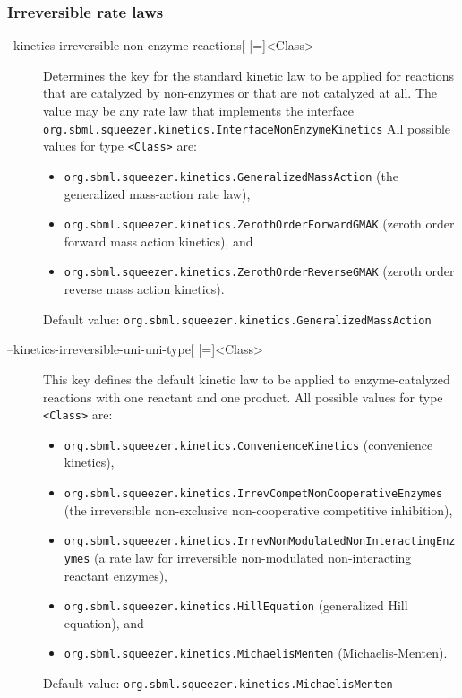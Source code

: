 \subsubsection{Irreversible rate laws}
\begin{description}
\item[--kinetics-irreversible-non-enzyme-reactions{[} |={]}<Class>]
  Determines the key for the standard kinetic law to be applied
  for reactions that are catalyzed by non-enzymes or that are
  not catalyzed at all. The value may be any rate law that implements the
  interface
  \texttt{org.sbml.squeezer.kinetics.InterfaceNonEnzymeKinetics}
  All possible values for type \texttt{<Class>} are:
  \begin{itemize}
  \item\texttt{org.sbml.squeezer.kinetics.GeneralizedMassAction} (the generalized mass-action rate law),
  \item\texttt{org.sbml.squeezer.kinetics.ZerothOrderForwardGMAK} (zeroth order forward mass action kinetics), and
  \item\texttt{org.sbml.squeezer.kinetics.ZerothOrderReverseGMAK} (zeroth order reverse mass action kinetics).
  \end{itemize}
  Default value: \texttt{org.sbml.squeezer.kinetics.GeneralizedMassAction}

\item[--kinetics-irreversible-uni-uni-type{[} |={]}<Class>]
  This key defines the default kinetic law to be applied to enzyme-catalyzed
  reactions with one reactant and one product.
  All possible values for type \texttt{<Class>} are:
  \begin{itemize}
  \item\texttt{org.sbml.squeezer.kinetics.ConvenienceKinetics} (convenience kinetics),
  \item\texttt{org.sbml.squeezer.kinetics.IrrevCompetNonCooperativeEnzymes} (the irreversible non-exclusive non-cooperative competitive inhibition),
  \item\texttt{org.sbml.squeezer.kinetics.IrrevNonModulatedNonInteractingEnzymes} (a rate law for irreversible non-modulated non-interacting reactant enzymes),
  \item\texttt{org.sbml.squeezer.kinetics.HillEquation} (generalized Hill equation), and
  \item\texttt{org.sbml.squeezer.kinetics.MichaelisMenten} (Michaelis-Menten).
  \end{itemize}
  Default value: \texttt{org.sbml.squeezer.kinetics.MichaelisMenten}


\end{description}
